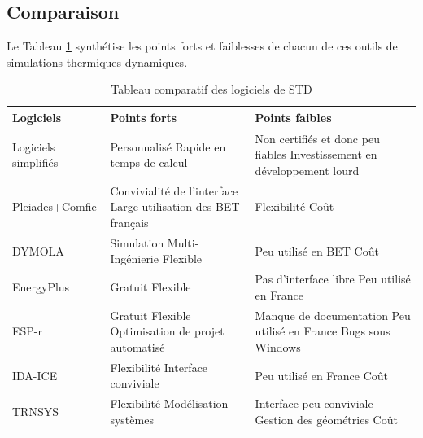 \subsection*{Comparaison}

Le Tableau \ref{Tab:Synthese_logiciels_STD} synthétise les points forts et faiblesses de chacun de ces outils de simulations thermiques dynamiques. 

\begin{table}
\centering
\begin{tabular}{|p{3.4cm}||p{5.75cm}|p{5.75cm}|}
\hline Logiciels & Points forts & Points faibles \\
\hline
\hline Logiciels simplifiés & Personnalisé \newline Rapide en temps de calcul & Non certifiés et donc peu fiables \newline Investissement en développement lourd \\
\hline Pleiades+Comfie & Convivialité de l'interface \newline Large utilisation des BET français & Flexibilité \newline Coût \\
\hline DYMOLA & Simulation Multi-Ingénierie \newline Flexible & Peu utilisé en BET \newline Coût \\
\hline EnergyPlus & Gratuit \newline Flexible & Pas d'interface libre \newline Peu utilisé en France \\
\hline ESP-r & Gratuit \newline Flexible \newline Optimisation de projet automatisé & Manque de documentation \newline Peu utilisé en France \newline Bugs sous Windows \\
\hline IDA-ICE & Flexibilité \newline Interface conviviale & Peu utilisé en France \newline Coût \\
\hline TRNSYS & Flexibilité \newline Modélisation systèmes  & Interface peu conviviale \newline Gestion des géométries \newline Coût \\
\hline 
\end{tabular}
\caption{Tableau comparatif des logiciels de STD}
\label{Tab:Synthese_logiciels_STD}
\end{table}

